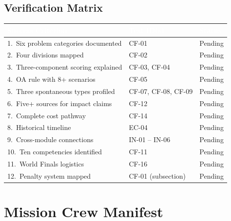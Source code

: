 \documentclass[11pt,letterpaper]{article}
\newcommand{\tableheader}[1]{\textbf{\sffamily\textcolor{white}{#1}}}
\begin{document}
\subsection{Verification Matrix}

\begin{center}
\begin{tabularx}{\textwidth}{XL{3.5cm}C{1.5cm}}
\toprule
{}
\tableheader{Success Criterion} & \tableheader{Test ID(s)} & \tableheader{Status} \\
.\ Six problem categories documented & CF-01 & Pending \\
2.\ Four divisions mapped & CF-02 & Pending \\
3.\ Three-component scoring explained & CF-03, CF-04 & Pending \\
4.\ OA rule with 8+ scenarios & CF-05 & Pending \\
5.\ Three spontaneous types profiled & CF-07, CF-08, CF-09 & Pending \\
6.\ Five+ sources for impact claims & CF-12 & Pending \\
7.\ Complete cost pathway & CF-14 & Pending \\
8.\ Historical timeline & EC-04 & Pending \\
9.\ Cross-module connections & IN-01 -- IN-06 & Pending \\
10.\ Ten competencies identified & CF-11 & Pending \\
11.\ World Finals logistics & CF-16 & Pending \\
12.\ Penalty system mapped & CF-01 (subsection) & Pending \\
\bottomrule
\end{tabularx}
\end{center}

\section{Mission Crew Manifest}
\end{document}
